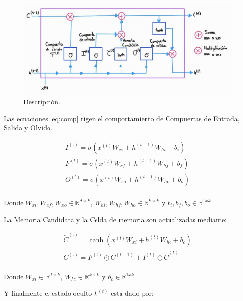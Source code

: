 \begin{figure}[ht!]
\centering
\includegraphics[width=1.0 \textwidth]{Chapters/1. Transformer/Figures/rnn/lstm.jpg}
\caption{Descripción.}
\label{fig:rnn_lstm}
\end{figure}

Las ecuaciones \ref{eq:comp} rigen el comportamiento de Compuertas de Entrada, Salida y Olvido.

\begin{equation}
    \begin{split}
        I^{(t)} =  \sigma(x^{(t)} W_{xi} + h^{(t-1)} W_{hi} + b_i)\\
        F^{(t)} =  \sigma(x^{(t)} W_{xf} + h^{(t-1)} W_{hf} + b_f)\\
        O^{(t)} =  \sigma(x^{(t)} W_{xo} + h^{(t-1)} W_{ho} + b_o)\\
    \end{split}
    \label{eq:comp}
\end{equation}

Donde $W_{xi}, W_{xf}, W_{xo} \in \mathbb{R}^{d \times k}$,
$W_{hi}, W_{hf}, W_{ho} \in \mathbb{R}^{k \times k}$ y $b_i, b_f, b_o \in \mathbb{R}^{1xk}$

La Memoria Candidata y la Celda de memoria son actualizadas mediante:

\begin{equation}
    \begin{split}
        \tilde C^{(t)} =  \tanh(x^{(t)} W_{xi} + h^{(t)} W_{hc} + b_c)\\
        C^{(t)} =  F^{(t)} \odot C^{(t-1)} + I^{(t)} \odot \tilde C^{(t)} \\
    \end{split}
\end{equation}

Donde $W_{xi} \in \mathbb{R}^{d \times k}$,
$W_{hc} \in \mathbb{R}^{k \times k}$ y $b_c \in \mathbb{R}^{1xk}$

Y finalmente el estado oculto $h^{(t)}$ esta dado por:

